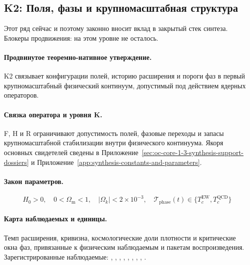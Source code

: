 \subsection{K2: Поля, фазы и крупномасштабная структура}
\label{sec:oc-core-1-3-synthesis-k2}
Этот ряд сейчас  и поэтому законно вносит вклад в закрытый стек синтеза.
Блокеры продвижения: на этом уровне не осталось.

\paragraph{Продвинутое теоремно-нативное утверждение.}
K2 связывает конфигурации полей, историю расширения и пороги фаз в первый крупномасштабный физический континуум, допустимый под действием ядерных операторов.

\paragraph{Связка оператора и уровня K.}
F, H и R ограничивают допустимость полей, фазовые переходы и запасы крупномасштабной стабилизации внутри физического континуума.
Якоря основных свидетелей сведены в Приложение~\ref{sec:oc-core-1-3-synthesis-support-dossiers} и Приложение~\ref{app:synthesis-constants-and-parameters}.

\paragraph{Закон параметров.}
\[
H_0 > 0,\quad 0 < \Omega_{\mathrm{m}} < 1,\quad |\Omega_k| < 2 \times 10^{-3},\quad \mathcal{T}_{\mathrm{phase}}(t) \in \{T_c^{\mathrm{EW}}, T_c^{\mathrm{QCD}}\}
\]

\paragraph{Карта наблюдаемых и единицы.}
Темп расширения, кривизна, космологические доли плотности и критические окна фаз, привязанные к физическим наблюдаемым и пакетам воспроизведения.
Зарегистрированные наблюдаемые: , \allowbreak {}, \allowbreak {}, \allowbreak {}, \allowbreak {}, \allowbreak {}, \allowbreak {}, \allowbreak {}, \allowbreak {}.

